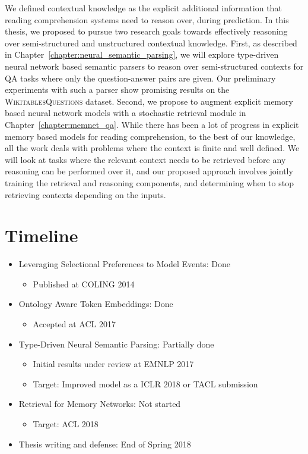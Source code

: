 We defined contextual knowledge as the explicit additional information that reading comprehension systems need to reason over, during prediction. In this thesis, we proposed to pursue two research goals towards effectively reasoning over semi-structured and unstructured contextual knowledge.
First, as described in Chapter~\ref{chapter:neural_semantic_parsing}, we will explore type-driven neural network based semantic parsers to reason over semi-structured contexts for QA tasks where only the question-answer pairs are given. Our preliminary experiments with such a parser show promising
results on the \textsc{WikitablesQuestions} dataset. Second, we propose to augment explicit memory based neural network models with a stochastic retrieval module in Chapter~\ref{chapter:memnet_qa}. While there has been a lot of progress in explicit memory based models for reading comprehension, to the best of our knowledge, all the
work deals with problems where the context is finite and well defined. We will look at tasks where the relevant context needs to be retrieved before any reasoning can be performed over it, and our proposed approach involves jointly training the retrieval and reasoning components, and determining
when to stop retrieving contexts depending on the inputs.

\section{Timeline}
\begin{itemize}
    \item Leveraging Selectional Preferences to Model Events: Done
    \begin{itemize}
     \item Published at COLING 2014
    \end{itemize}

    \item Ontology Aware Token Embeddings: Done
    \begin{itemize}
        \item Accepted at ACL 2017
    \end{itemize}
    
    \item Type-Driven Neural Semantic Parsing: Partially done
    \begin{itemize}
     \item Initial results under review at EMNLP 2017
     \item Target: Improved model as a ICLR 2018 or TACL submission
    \end{itemize}

    \item Retrieval for Memory Networks: Not started
    \begin{itemize}
     \item Target: ACL 2018
    \end{itemize}
    
    \item Thesis writing and defense: End of Spring 2018
\end{itemize}
